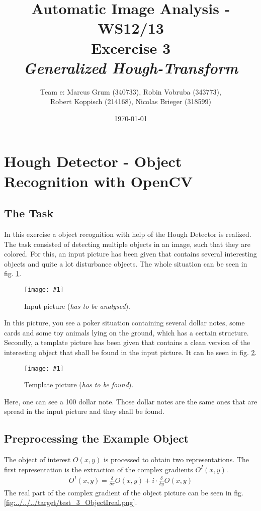 \documentclass[a4paper,headings=small]{scrartcl}
\title{Automatic Image Analysis - WS12/13 \\ Excercise 3 \\ \emph{Generalized Hough-Transform}}
\author{Team e: Marcus Grum (340733), Robin Vobruba (343773), \\ Robert Koppisch (214168), Nicolas Brieger (318599)}
\date{\today}
\numberwithin{equation}{section} %
\numberwithin{figure}{section}   %
\newcommand{\image}[3]{
	\begin{figure}[htbp]
		\centering
		\texttt{[image: \#1]}
		\caption{#3}
		\label{fig:#1}
	\end{figure}
}
\newcommand{\generatedImgRoot}{../../../target}
\newcommand{\targetFlag}{test_} %
\begin{document}
\maketitle

\section{Hough Detector - Object Recognition with OpenCV}


\subsection{The Task}
In this exercise a object recognition with help of the Hough Detector is realized. 
The task consisted of detecting multiple objects in an image, such that they are colored.
For this, an input picture has been given that contains several interesting objects and 
quite a lot disturbance objects. The whole situation can be seen in 
fig. \ref{fig:\generatedImgRoot/\targetFlag1_Input.jpg}.

\image{\generatedImgRoot/\targetFlag1_Input.jpg}{0.4}{%
		Input picture (\emph{has to be analysed}).}

In this picture, you see a poker situation containing several dollar notes, some cards
and some toy animals lying on the ground, which has a certain structure.
Secondly, a template picture has been given that contains a clean version of the
interesting object that shall be found in the input picture.
It can be seen in fig. \ref{fig:\generatedImgRoot/\targetFlag2_Template.jpg}.

\image{\generatedImgRoot/\targetFlag2_Template.jpg}{0.3}{%
		Template picture (\emph{has to be found}).}

Here, one can see a 100 dollar note. Those dollar notes are the same ones
that are spread in the input picture and they shall be found.

\subsection{Preprocessing the Example Object}

The object of interest $O(x,y)$ is processed to obtain two representations.
The first representation is the extraction of the complex gradients $O^I(x,y)$.
\begin{align}
O^I(x,y) = \frac{\delta}{\delta x} O(x,y) + i \cdot \frac{\delta}{\delta y} O(x,y) 
\end{align}
The real part of the complex gradient of the object picture can be seen in 
fig. \ref{fig:\generatedImgRoot/\targetFlag3_ObjectIreal.png}.
\end{document}
